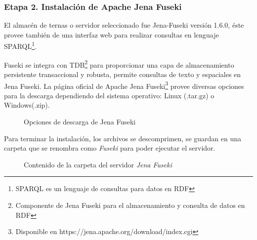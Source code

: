 \subsubsection{Etapa 2. Instalaci\'on de Apache Jena Fuseki}

El almac\'en de ternas o servidor seleccionado fue Jena-Fuseki versi\'on 1.6.0, \'este provee tambi\'en de una interfaz web para realizar consultas en lenguaje SPARQL\footnote{SPARQL es un lenguaje de consultas para datos en RDF}. \newline

Fuseki se integra con TDB\footnote{Componente de Jena Fuseki para el almacenamiento y consulta de datos en RDF} para proporcionar una capa de almacenamiento persistente transaccional y robusta, permite consultas de texto y espaciales en Jena Fuseki\cite{JenaFuseki}. La p\'agina oficial de Apache Jena Fuseki\footnote{Disponible en https://jena.apache.org/download/index.cgi} provee diversas opciones para la descarga dependiendo del sistema operativo: Linux (.tar.gz) o Windows(.zip). \newline

\begin{figure}[!ht]
	\centering
    \caption{Opciones de descarga de Jena Fuseki}
\label{opcionesDescargaFuseki}
\end{figure}

Para terminar la instalaci\'on, los archivos se descomprimen, se guardan en una carpeta que se renombra como \textit{Fuseki} para poder ejecutar el servidor.\newline

\begin{figure}[!ht]
	\centering
    \caption{Contenido de la carpeta del servidor \textit{Jena Fuseki}}
    \label{opcionesDescargaFuseki}
\end{figure}

